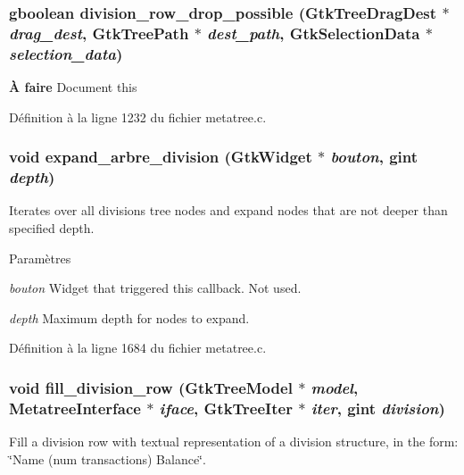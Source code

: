 \subsubsection[{division\_\-row\_\-drop\_\-possible}]{\setlength{\rightskip}{0pt plus 5cm}gboolean division\_\-row\_\-drop\_\-possible (GtkTreeDragDest $\ast$ {\em drag\_\-dest}, \/  GtkTreePath $\ast$ {\em dest\_\-path}, \/  GtkSelectionData $\ast$ {\em selection\_\-data})}\label{metatree_8c_a6be29e102e03a967453310f0224dd450}
\begin{Desc}
\item[{\bf À faire}]Document this\end{Desc}


Définition à la ligne 1232 du fichier metatree.c.

\subsubsection[{expand\_\-arbre\_\-division}]{\setlength{\rightskip}{0pt plus 5cm}void expand\_\-arbre\_\-division (GtkWidget $\ast$ {\em bouton}, \/  gint {\em depth})}\label{metatree_8c_a69bc59e1ce9e70ce93b4206aed12d7f3}
Iterates over all divisions tree nodes and expand nodes that are not deeper than specified depth.


\begin{DoxyParams}{Paramètres}
\item[{\em bouton}]Widget that triggered this callback. Not used. \item[{\em depth}]Maximum depth for nodes to expand. \end{DoxyParams}


Définition à la ligne 1684 du fichier metatree.c.

\subsubsection[{fill\_\-division\_\-row}]{\setlength{\rightskip}{0pt plus 5cm}void fill\_\-division\_\-row (GtkTreeModel $\ast$ {\em model}, \/  {\bf MetatreeInterface} $\ast$ {\em iface}, \/  GtkTreeIter $\ast$ {\em iter}, \/  gint {\em division})}\label{metatree_8c_a3a39c8d7bec94526c1ce601db6bc0767}
Fill a division row with textual representation of a division structure, in the form: \char`\"{}Name (num transactions) Balance\char`\"{}.


